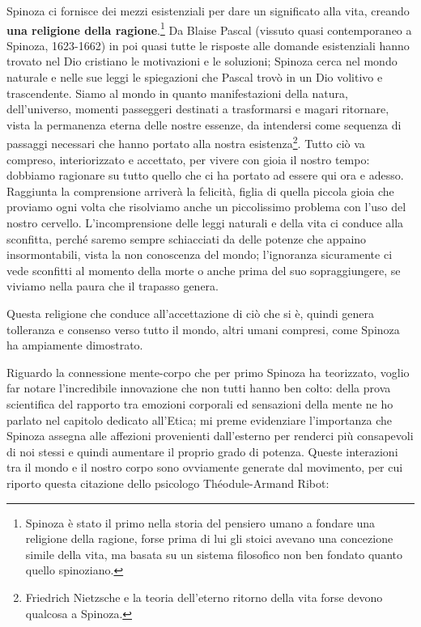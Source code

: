 Spinoza ci fornisce dei mezzi esistenziali per dare un significato alla vita, creando \textbf{una religione della ragione}.\footnote{Spinoza è stato il primo nella storia del pensiero umano a fondare una religione della ragione, forse prima di lui gli stoici avevano una concezione simile della vita, ma basata su un sistema filosofico non ben fondato quanto quello spinoziano.} Da Blaise Pascal (vissuto quasi contemporaneo a Spinoza, 1623-1662) in poi quasi tutte le risposte alle domande esistenziali hanno trovato nel Dio cristiano le motivazioni e le soluzioni; Spinoza cerca nel mondo naturale e nelle sue leggi le spiegazioni che Pascal trovò in un Dio volitivo e trascendente. Siamo al mondo in quanto manifestazioni della natura, dell'universo, momenti passeggeri destinati a trasformarsi e magari ritornare, vista la permanenza eterna delle nostre essenze, da intendersi come sequenza di passaggi necessari che hanno portato alla nostra esistenza\footnote{Friedrich Nietzsche e la teoria dell'eterno ritorno della vita forse devono qualcosa a Spinoza.}. Tutto ciò va compreso, interiorizzato e accettato, per vivere con gioia il nostro tempo: dobbiamo ragionare su tutto quello che ci ha portato ad essere qui ora e adesso. Raggiunta la comprensione arriverà la felicità, figlia di quella piccola gioia che proviamo ogni volta che risolviamo anche un piccolissimo problema con l'uso del nostro cervello. L'incomprensione delle leggi naturali e della vita ci conduce alla sconfitta, perché saremo sempre schiacciati da delle potenze che appaino insormontabili, vista la non conoscenza del mondo; l'ignoranza sicuramente ci vede sconfitti al momento della morte o anche prima del suo sopraggiungere, se viviamo nella paura che il trapasso genera. 

Questa religione che conduce  all'accettazione di ciò che si è, quindi genera tolleranza e consenso verso tutto il mondo, altri umani compresi, come Spinoza ha ampiamente dimostrato.

Riguardo la connessione mente-corpo che per primo Spinoza ha teorizzato, voglio far notare l'incredibile innovazione che non tutti hanno ben colto: della prova scientifica del rapporto tra emozioni corporali ed sensazioni della mente ne ho parlato nel capitolo dedicato all'Etica; mi preme evidenziare l'importanza che Spinoza assegna alle affezioni provenienti dall'esterno per renderci più consapevoli di noi stessi e quindi aumentare il proprio grado di potenza. Queste interazioni tra il mondo e il nostro corpo sono ovviamente generate dal movimento, per cui riporto questa citazione dello psicologo Théodule-Armand Ribot: 

